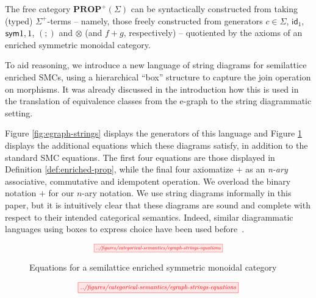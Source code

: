 The free category $\textbf{PROP}^+(\Sigma)$ can be syntactically constructed from taking (typed) $\Sigma^+$-terms  -- namely, those freely constructed from generators $c \in \Sigma$, $\textsf{id}_1$, $\textsf{sym}{1,1}$, $(;\!)$ and $\otimes$ (and $f+g$, respectively) -- quotiented by the axioms of an enriched symmetric monoidal category.  

To aid reasoning, we introduce a new language of string diagrams for semilattice enriched SMCs, using a hierarchical ``box'' structure to capture the join operation on morphisms.  It was already discussed in the introduction how this is  used in the translation of equivalence classes from the e-graph to the string diagrammatic setting. 

Figure \ref{fig:egraph-strings} displays the generators of this language and Figure \ref{fig:string-equations} displays the additional equations which these diagrams satisfy, in addition to the standard SMC equations. 
The first four equations are those displayed in Definition \ref{def:enriched-prop},  while the final four axiomatize $+$ as an \textit{n-ary} associative, commutative and idempotent operation.  We overload the binary notation $+$ for our $n$-ary notation.  
We use string diagrams informally in this paper, but it is intuitively clear that these diagrams are sound and complete with respect to their intended categorical semantics. 
Indeed, similar diagrammatic languages using boxes to express choice have been used before~\cite{duncan_generalised_2009}. 

\ifdefined \ONECOLUMN
\begin{figure}
	\[  
		\scalebox{0.6}{
		\tikzfig{../figures/categorical-semantics/egraph-strings-equations}
		}
	\]
	\caption{Equations for a  semilattice enriched symmetric monoidal category}
	\label{fig:string-equations}
	\end{figure}
\else
\begin{figure*}
\[  
    \scalebox{0.75}{
	\tikzfig{../figures/categorical-semantics/egraph-strings-equations}
    }
\]
\caption{Equations for a  semilattice enriched symmetric monoidal category}
\label{fig:string-equations}
\end{figure*}
\fi